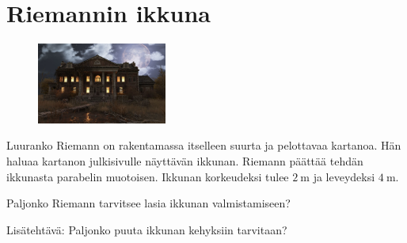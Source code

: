 \clearpage

\section{Riemannin ikkuna}

\begin{figure}
  \begin{center}
    \includegraphics[width=0.38\textwidth]{kuvat/riemann_kartano.jpg}
  \end{center}
\end{figure}

Luuranko Riemann on rakentamassa itselleen suurta ja pelottavaa kartanoa. Hän haluaa kartanon julkisivulle näyttävän ikkunan. Riemann päättää tehdän ikkunasta parabelin muotoisen. Ikkunan korkeudeksi tulee $2 \ \text{m}$ ja leveydeksi $4 \ \text{m}$.


Paljonko Riemann tarvitsee lasia ikkunan valmistamiseen?

Lisätehtävä: Paljonko puuta ikkunan kehyksiin tarvitaan?